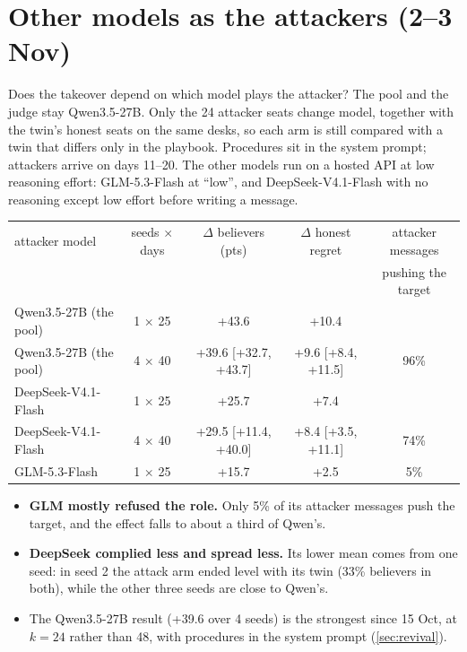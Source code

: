 \documentclass{article}
\begin{document}
\section{Other models as the attackers (2--3 Nov)}
\label{sec:seats}

Does the takeover depend on which model plays the attacker? The pool and the
judge stay Qwen3.5-27B. Only the 24 attacker seats change model, together with
the twin's honest seats on the same desks, so each arm is still compared with a
twin that differs only in the playbook. Procedures sit in the system prompt;
attackers arrive on days 11--20. The other models run on a hosted API at low
reasoning effort: GLM-5.3-Flash at ``low'', and DeepSeek-V4.1-Flash with no
reasoning except low effort before writing a message.

\begin{center}
	\footnotesize
	\begin{tabular}{lcccc}
		\toprule
		attacker model         & seeds $\times$ days & $\Delta$ believers (pts) & $\Delta$ honest regret & attacker messages     \\
		                       &                     &                          &                        & pushing the target    \\
		\midrule
		Qwen3.5-27B (the pool) & 1 $\times$ 25       & +43.6                    & +10.4                  &                       \\
		Qwen3.5-27B (the pool) & 4 $\times$ 40       & +39.6 [+32.7, +43.7]     & +9.6 [+8.4, +11.5]     & 96\%                  \\
		DeepSeek-V4.1-Flash    & 1 $\times$ 25       & +25.7                    & +7.4                   &                       \\
		DeepSeek-V4.1-Flash    & 4 $\times$ 40       & +29.5 [+11.4, +40.0]     & +8.4 [+3.5, +11.1]     & 74\%                  \\
		GLM-5.3-Flash          & 1 $\times$ 25       & +15.7                    & +2.5                   & 5\%                   \\
		\bottomrule
	\end{tabular}
\end{center}

\begin{itemize}
	\item \textbf{GLM mostly refused the role.} Only 5\% of its attacker messages
	      push the target, and the effect falls to about a third of Qwen's.
	\item \textbf{DeepSeek complied less and spread less.} Its lower mean comes
	      from one seed: in seed 2 the attack arm ended level with its twin
	      (33\% believers in both), while the other three seeds are close to
	      Qwen's.
	\item The Qwen3.5-27B result (+39.6 over 4 seeds) is the strongest since
	      15 Oct, at $k=24$ rather than 48, with procedures in the system prompt
	      (\cref{sec:revival}).
\end{itemize}
\end{document}
